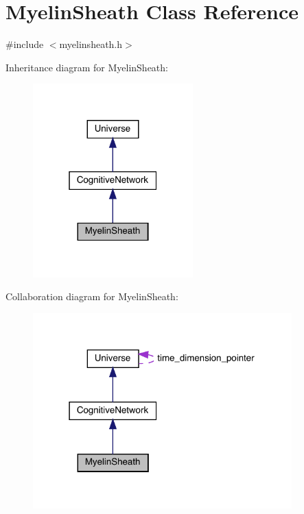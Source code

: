 \hypertarget{class_myelin_sheath}{}\section{Myelin\+Sheath Class Reference}
\label{class_myelin_sheath}


{\ttfamily \#include $<$myelinsheath.\+h$>$}



Inheritance diagram for Myelin\+Sheath\+:\nopagebreak
\begin{figure}[H]
\begin{center}
\leavevmode
\includegraphics[width=175pt]{class_myelin_sheath__inherit__graph}
\end{center}
\end{figure}


Collaboration diagram for Myelin\+Sheath\+:
\nopagebreak
\begin{figure}[H]
\begin{center}
\leavevmode
\includegraphics[width=283pt]{class_myelin_sheath__coll__graph}
\end{center}
\end{figure}
